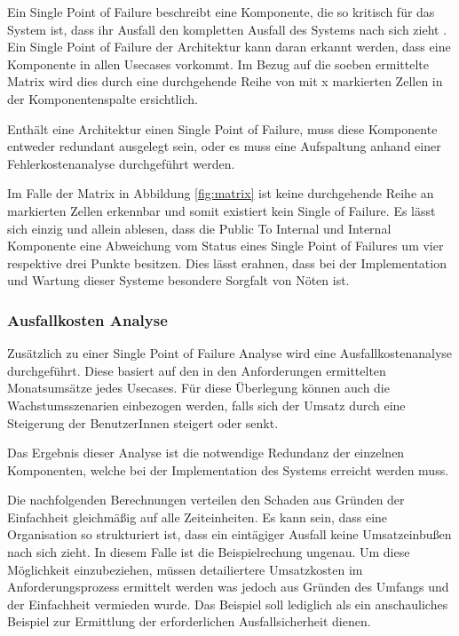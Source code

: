 Ein Single Point of Failure beschreibt eine Komponente, die so kritisch für das System ist, dass ihr Ausfall den kompletten Ausfall des Systems nach sich zieht \cite[S. 3]{single}. Ein Single Point of Failure der Architektur kann daran erkannt werden, dass eine Komponente in allen Usecases vorkommt. Im Bezug auf die soeben ermittelte Matrix wird dies durch eine durchgehende Reihe von mit x markierten Zellen in der Komponentenspalte ersichtlich.

Enthält eine Architektur einen Single Point of Failure, muss diese Komponente entweder redundant ausgelegt sein, oder es muss eine Aufspaltung anhand einer Fehlerkostenanalyse durchgeführt werden.

Im Falle der Matrix in Abbildung \ref{fig:matrix} ist keine durchgehende Reihe an markierten Zellen erkennbar und somit existiert kein Single of Failure. Es lässt sich einzig und allein ablesen, dass die Public To Internal und Internal Komponente eine Abweichung vom Status eines Single Point of Failures um vier respektive drei Punkte besitzen. Dies lässt erahnen, dass bei der Implementation und Wartung dieser Systeme besondere Sorgfalt von Nöten ist.

\subsubsection{Ausfallkosten Analyse}
Zusätzlich zu einer Single Point of Failure Analyse wird eine Ausfallkostenanalyse durchgeführt. Diese basiert auf den in den Anforderungen ermittelten Monatsumsätze jedes Usecases. Für diese Überlegung können auch die Wachstumsszenarien einbezogen werden, falls sich der Umsatz durch eine Steigerung der BenutzerInnen steigert oder senkt.

Das Ergebnis dieser Analyse ist die notwendige Redundanz der einzelnen Komponenten, welche bei der Implementation des Systems erreicht werden muss.

Die nachfolgenden Berechnungen verteilen den Schaden aus Gründen der Einfachheit gleichmäßig auf alle Zeiteinheiten. Es kann sein, dass eine Organisation so strukturiert ist, dass ein eintägiger Ausfall keine Umsatzeinbußen nach sich zieht. In diesem Falle ist die Beispielrechung ungenau. Um diese Möglichkeit einzubeziehen, müssen detailiertere Umsatzkosten im Anforderungsprozess ermittelt werden was jedoch aus Gründen des Umfangs und der Einfachheit vermieden wurde. Das Beispiel soll lediglich als ein anschauliches Beispiel zur Ermittlung der erforderlichen Ausfallsicherheit dienen.

